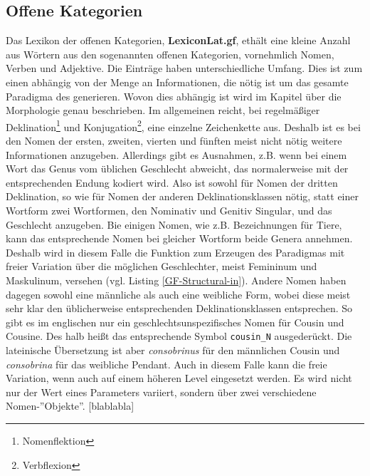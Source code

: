 \documentclass[12pt,abstract=on]{scrreprt}
\begin{document}
\subsection{Offene Kategorien}
Das Lexikon der offenen Kategorien, \textbf{LexiconLat.gf}, ethält eine kleine Anzahl aus Wörtern aus den sogenannten offenen Kategorien, vornehmlich Nomen, Verben und Adjektive. 
Die Einträge haben unterschiedliche Umfang. Dies ist zum einen abhängig von der Menge an Informationen, die nötig ist um das gesamte Paradigma des generieren. Wovon dies abhängig ist wird im Kapitel über die Morphologie genau beschrieben. Im allgemeinen reicht, bei regelmäßiger Deklination\footnote{Nomenflektion} und Konjugation\footnote{Verbflexion}, eine einzelne Zeichenkette aus. Deshalb ist es bei den Nomen der ersten, zweiten, vierten und fünften meist nicht nötig weitere Informationen anzugeben. Allerdings gibt es Ausnahmen, z.B. wenn bei einem Wort das Genus vom üblichen Geschlecht abweicht, das normalerweise mit der entsprechenden Endung kodiert wird. Also ist sowohl für Nomen der dritten Deklination, so wie für Nomen der anderen Deklinationsklassen nötig, statt einer Wortform zwei Wortformen, den Nominativ und Genitiv Singular, und das Geschlecht anzugeben. Bie einigen Nomen, wie z.B. Bezeichnungen für Tiere, kann das entsprechende Nomen bei gleicher Wortform beide Genera annehmen. Deshalb wird in diesem Falle die Funktion zum Erzeugen des Paradigmas mit freier Variation über die möglichen Geschlechter, meist Femininum und Maskulinum, versehen (vgl. Listing \ref{GF-Structural-in}). Andere Nomen haben dagegen sowohl eine männliche als auch eine weibliche Form, wobei diese meist sehr klar den üblicherweise entsprechenden Deklinationsklassen entsprechen. So gibt es im englischen nur ein geschlechtsunspezifisches Nomen für Cousin und Cousine. Des halb heißt das entsprechende Symbol \texttt{cousin\_N} ausgederückt. Die lateinische Übersetzung ist aber \textit{consobrinus} für den männlichen Cousin und \textit{consobrina} für das weibliche Pendant. Auch in diesem Falle kann die freie Variation, wenn auch auf einem höheren Level eingesetzt werden. Es wird nicht nur der Wert eines Parameters variiert, sondern über zwei verschiedene Nomen-''Objekte''. [blablabla]


\FloatBarrier
\pagebreak
\end{document}

